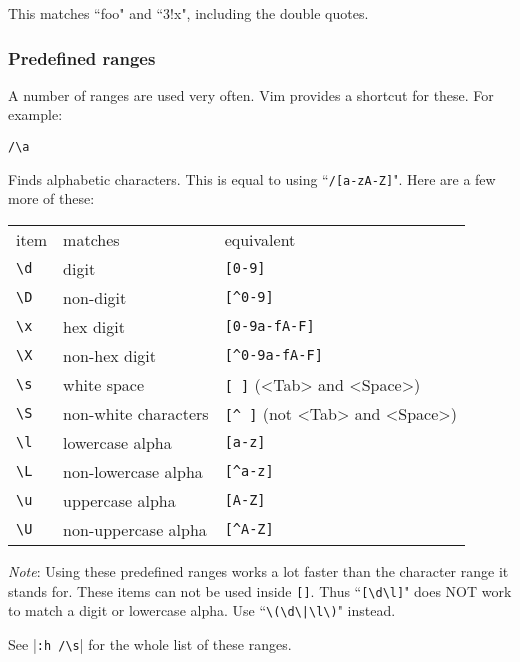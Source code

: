 This matches ``foo" and ``3!x", including the double quotes.
\subsubsection{Predefined ranges}
A number of ranges are used very often.
Vim provides a shortcut for these.
For example:

\begin{Verbatim}[samepage=true]
 /\a
\end{Verbatim}

Finds alphabetic characters.
This is equal to using ``\texttt{/[a-zA-Z]}".
Here are a few more of these:

\begin{center} \begin{tabular}{l l l}
				item & matches & equivalent \\
				\texttt{\textbackslash{}d} & digit & \texttt{[0-9]}\\
				\texttt{\textbackslash{}D} & non-digit & \texttt{[\^{}0-9]}\\
				\texttt{\textbackslash{}x} & hex digit & \texttt{[0-9a-fA-F]}\\
				\texttt{\textbackslash{}X} & non-hex digit & \texttt{[\^{}0-9a-fA-F]}\\
				\texttt{\textbackslash{}s} & white space & \texttt{[   ]} (<Tab> and <Space>)\\
				\texttt{\textbackslash{}S} & non-white characters & \texttt{[\^{}  ]} (not <Tab> and <Space>)\\
				\texttt{\textbackslash{}l} & lowercase alpha & \texttt{[a-z]}\\
				\texttt{\textbackslash{}L} & non-lowercase alpha & \texttt{[\^{}a-z]}\\
				\texttt{\textbackslash{}u} & uppercase alpha & \texttt{[A-Z]}\\
				\texttt{\textbackslash{}U} & non-uppercase alpha & \texttt{[\^{}A-Z]}\\
\end{tabular} \end{center}

\emph{Note}:
Using these predefined ranges works a lot faster than the character range it stands for.
These items can not be used inside \texttt{[]}.
Thus ``\texttt{[\textbackslash{}d\textbackslash{}l]}" does NOT work to match a digit or lowercase alpha.
Use ``\texttt{\textbackslash{}(\textbackslash{}d\textbackslash{}|\textbackslash{}l\textbackslash{})}" instead.

See |\texttt{:h /\textbackslash{}s}| for the whole list of these ranges.
